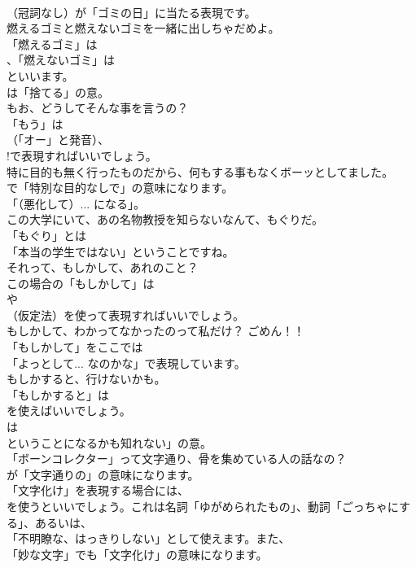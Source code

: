 \documentclass[8pt]{extreport}
\begin{document}
\begin{CJK}{UTF8}{min}
\\	（冠詞なし）が「ゴミの日」に当たる表現です。	
\\	燃えるゴミと燃えないゴミを一緒に出しちゃだめよ。 
\\	「燃えるゴミ」は 
\\	、「燃えないゴミ」は 
\\	といいます。
\\	は「捨てる」の意。	
\\	もお、どうしてそんな事を言うの？ 
\\	「もう」は
\\	（「オー」と発音）、
\\	!で表現すればいいでしょう。	
\\	特に目的も無く行ったものだから、何もする事もなくボーッとしてました。 
\\	で「特別な目的なしで」の意味になります。
\\	「（悪化して）... になる」。	
\\	この大学にいて、あの名物教授を知らないなんて、もぐりだ。 
\\	「もぐり」とは
\\	「本当の学生ではない」ということですね。	
\\	それって、もしかして、あれのこと？ 
\\	この場合の「もしかして」は
\\	や
\\	（仮定法）を使って表現すればいいでしょう。	
\\	もしかして、わかってなかったのって私だけ？ ごめん！！ 
\\	「もしかして」をここでは
\\	「よっとして... なのかな」で表現しています。	
\\	もしかすると、行けないかも。 
\\	「もしかすると」は
\\	を使えばいいでしょう。
\\	は
\\	ということになるかも知れない」の意。	
\\	「ボーンコレクター」って文字通り、骨を集めている人の話なの？ 
\\	が「文字通りの」の意味になります。	
\\	「文字化け」を表現する場合には、
\\	を使うといいでしょう。これは名詞「ゆがめられたもの」、動詞「ごっちゃにする」、あるいは、
\\	「不明瞭な、はっきりしない」として使えます。また、
\\	「妙な文字」でも「文字化け」の意味になります。	

\end{CJK}
\end{document}
